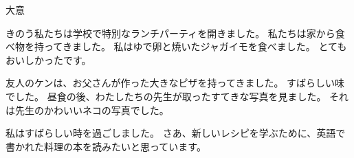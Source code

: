 \documentclass[aspectratio=169,xcolor={dvipsnames,table}]{beamer}
\begin{document}
\begin{frame}[plain]{大意}

  \begin{tcolorbox}\zw
    きのう私たちは学校で特別なランチパーティを開きました。
    私たちは家から食べ物を持ってきました。
    私はゆで卵と焼いたジャガイモを食べました。
    とてもおいしかったです。

    友人のケンは、お父さんが作った大きなピザを持ってきました。
    すばらしい味でした。
    昼食の後、わたしたちの先生が取ったすてきな写真を見ました。
    それは先生のかわいいネコの写真でした。

    私はすばらしい時を過ごしました。
    さあ、新しいレシピを学ぶために、英語で書かれた料理の本を読みたいと思っています。
  \end{tcolorbox}

\end{frame}
\end{document}
